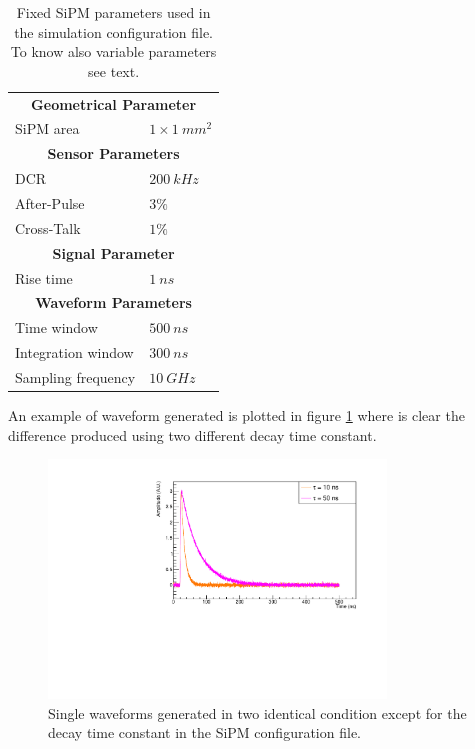 \begin{table}
	\centering
	\setlength{\tabcolsep}{18pt}
	\begin{tabular}{ll}
		\toprule
		\multicolumn{2}{c}{\textbf{Geometrical Parameter}}	\\
		SiPM area	& $1 \times 1\ mm^2$	\\
		\midrule
		\multicolumn{2}{c}{\textbf{Sensor Parameters}}	\\
		DCR			& $200 \ kHz$	\\
		After-Pulse	& $3\% $	\\
		Cross-Talk	& $1\% $	\\
		\midrule
		\multicolumn{2}{c}{\textbf{Signal Parameter}}	\\
		Rise time	& $1\ ns$	\\
		\midrule
		\multicolumn{2}{c}{\textbf{Waveform Parameters}}	\\
		Time window	& $500 \ ns$	\\
		Integration window	& $300 \ ns$	\\
		Sampling frequency	& $10\ GHz$	\\
		\bottomrule
	\end{tabular}
	\caption{Fixed SiPM parameters used in the simulation configuration file. To know also variable parameters see text.}
	\label{tab:SiPM_par}
\end{table}

An example of waveform generated is plotted in figure \ref{fig:diff_wf} where is clear the difference produced using two different decay time constant.

\begin{figure}
	\centering
	\includegraphics[width=0.8\textwidth]{IMG/Cap5/wf_different_conf}
	\caption{Single waveforms generated in two identical condition except for the decay time constant in the SiPM configuration file.}
	\label{fig:diff_wf}
\end{figure}

